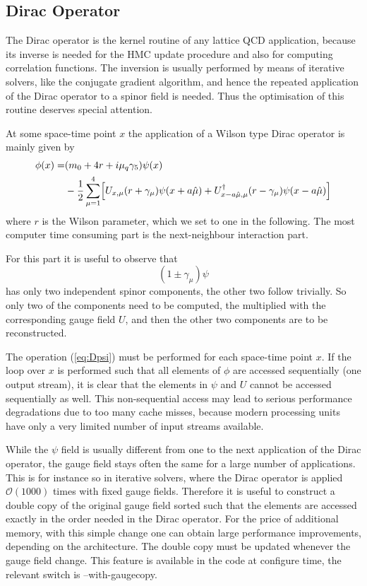 \subsection{Dirac Operator}
\label{sec:dirac}

The Dirac operator is the kernel routine of any lattice QCD
application, because its inverse is needed for the HMC update
procedure and also for computing correlation functions. The inversion
is usually performed by means of iterative solvers, like the conjugate
gradient algorithm, and hence the repeated application of the Dirac
operator to a spinor field is needed. Thus the optimisation of this
routine deserves special attention.

At some space-time point $x$ the application of a Wilson type Dirac
operator is mainly given by
\begin{equation}
  \label{eq:Dpsi}
  \begin{split}
    \phi(x) = & (m_0 + 4r +i\mu_q\gamma_5)\psi(x) \\
    &- \frac{1}{2}\sum_{\mu = 1}^4\Bigl[
    U_{x,\mu}(r+\gamma_\mu) \psi(x+a\hat\mu)  + U^\dagger_{x-a\hat\mu,\mu}
    (r-\gamma_\mu)\psi(x-a\hat\mu)\Bigr] \\
  \end{split}
\end{equation}
where $r$ is the Wilson parameter, which we set to one in the
following. The most computer time consuming part is the next-neighbour
interaction part.

For this part it is useful to observe that 
\[
(1\pm \gamma_\mu)\psi
\]
has only two independent spinor components, the other two follow
trivially. So only two of the components need to be computed, the
multiplied with the corresponding gauge field $U$, and then the other
two components are to be reconstructed.

The operation (\ref{eq:Dpsi}) must be performed for each space-time
point $x$. If the loop over $x$ is performed such that all elements
of $\phi$ are accessed sequentially (one output stream), it is clear
that the elements in $\psi$ and $U$ cannot be accessed sequentially as
well. This non-sequential access may lead to serious performance
degradations due to too many cache misses, because modern processing
units have only a very limited number of input streams available. 

While the $\psi$  field is usually different from
one to the next application of the Dirac operator, the gauge field
stays often the same for a large number of applications. This is for
instance so in iterative solvers, where the Dirac operator is applied
$\mathcal{O}(1000)$ times with fixed gauge fields. Therefore it is
useful to construct a double copy of the original gauge field sorted
such that the elements are accessed exactly in the order needed in the
Dirac operator. For the price of additional memory, with this simple
change one can obtain large performance improvements, depending on the
architecture. The double copy must be updated whenever the gauge field
change. This feature is available in the code at configure time, the
relevant switch is {\ttfamily --with-gaugecopy}.

